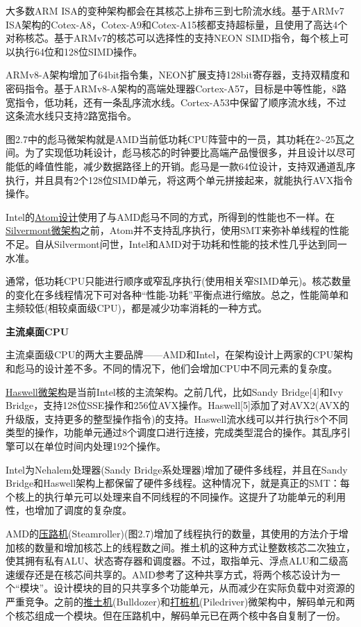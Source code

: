 大多数ARM ISA的变种架构都会在其核芯上排布三到七阶流水线。基于ARMv7 ISA架构的Cotex-A8，Cotex-A9和Cotex-A15核都支持超标量，且使用了高达4个对称核芯。基于ARMv7的核芯可以选择性的支持NEON SIMD指令，每个核上可以执行64位和128位SIMD操作。

ARMv8-A架构增加了64bit指令集，NEON扩展支持128bit寄存器，支持双精度和密码指令。基于ARMv8-A架构的高端处理器Cortex-A57，目标是中等性能，8路宽指令，低功耗，还有一条乱序流水线。Cortex-A53中保留了顺序流水线，不过这条流水线只支持2路宽指令。

图2.7中的彪马微架构就是AMD当前低功耗CPU阵营中的一员，其功耗在2\textasciitilde{}25瓦之间。为了实现低功耗设计，彪马核芯的时钟要比高端产品慢很多，并且设计以尽可能低的峰值性能，减少数据路径上的开销。彪马是一款64位设计，支持双通道乱序执行，并且具有2个128位SIMD单元，将这两个单元拼接起来，就能执行AVX指令操作。

Intel的\href{https://zh.wikipedia.org/wiki/\%E8\%8B\%B1\%E7\%89\%B9\%E7\%88\%BEAtom}{Atom设计}使用了与AMD彪马不同的方式，所得到的性能也不一样。在\href{https://en.wikipedia.org/wiki/Silvermont}{Silvermont微架构}之前，Atom并不支持乱序执行，使用SMT来弥补单线程的性能不足。自从Silvermont问世，Intel和AMD对于功耗和性能的技术性几乎达到同一水准。

通常，低功耗CPU只能进行顺序或窄乱序执行(使用相关窄SIMD单元)。核芯数量的变化在多线程情况下可对各种“性能-功耗”平衡点进行缩放。总之，性能简单和主频较低(相较桌面级CPU)，都是减少功率消耗的一种方式。

\textbf{主流桌面CPU}

主流桌面级CPU的两大主要品牌——AMD和Intel，在架构设计上两家的CPU架构和彪马的设计差不多。不同的情况下，他们会增加CPU中不同元素的复杂度。

\href{https://zh.wikipedia.org/wiki/Haswell\%E5\%BE\%AE\%E6\%9E\%B6\%E6\%A7\%8B}{Haswell微架构}是当前Intel核的主流架构。之前几代，比如Sandy Bridge[4]和Ivy Bridge，支持128位SSE操作和256位AVX操作。Haswell[5]添加了对AVX2(AVX的升级版，支持更多的整型操作指令)的支持。Haswell流水线可以并行执行8个不同类型的操作，功能单元通过8个调度口进行连接，完成类型混合的操作。其乱序引擎可以在单位时间内处理192个操作。

Intel为Nehalem处理器(Sandy Bridge系处理器)增加了硬件多线程，并且在Sandy Bridge和Haswell架构上都保留了硬件多线程。这种情况下，就是真正的SMT：每个核上的执行单元可以处理来自不同线程的不同操作。这提升了功能单元的利用性，也增加了调度的复杂度。

AMD的\href{https://zh.wikipedia.org/wiki/AMD\_Steamroller}{压路机}(Steamroller)(图2.7)增加了线程执行的数量，其使用的方法介于增加核的数量和增加核芯上的线程数之间。推土机的这种方式让整数核芯二次独立，使其拥有私有ALU、状态寄存器和调度器。不过，取指单元、浮点ALU和二级高速缓存还是在核芯间共享的。AMD参考了这种共享方式，将两个核芯设计为一个“模块”。设计模块的目的只共享多个功能单元，从而减少在实际负载中对资源的严重竞争。之前的\href{https://zh.wikipedia.org/wiki/AMD\_Bulldozer}{推土机}(Bulldozer)和\href{https://zh.wikipedia.org/wiki/AMD\_Piledriver}{打桩机}(Piledriver)微架构中，解码单元和两个核芯组成一个模块。但在压路机中，解码单元已在两个核中各自复制了一份。

